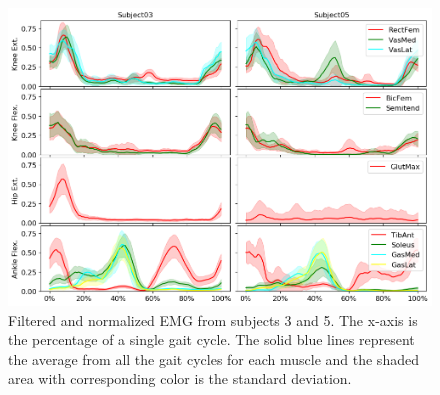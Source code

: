 \begin{figure}[ht!]
    \centering
    \includegraphics[width=\textwidth]{img/results/emg_avg/subjects3and5_grid_emg_avg.png}
    \caption{Filtered and normalized \ac{EMG} from subjects 3 and 5. The x-axis is the percentage of a single gait cycle. The solid blue lines represent the average from all the gait cycles for each muscle and the shaded area with corresponding color is the standard deviation.}
    \label{fig:A-emg-average}
\end{figure}
%

\newpage
